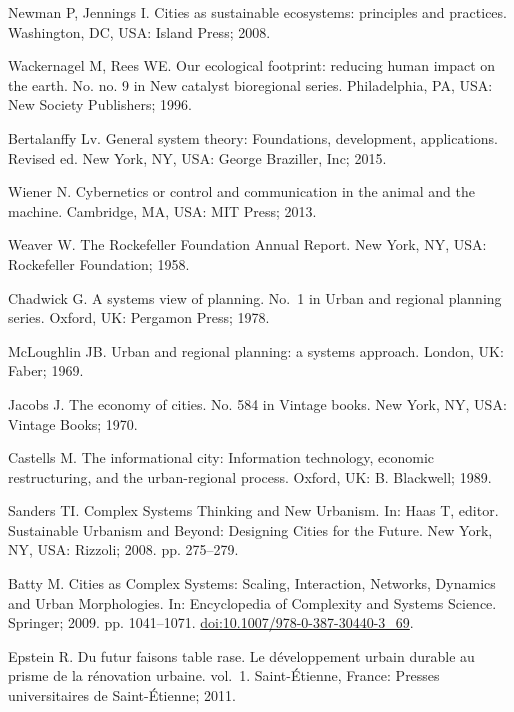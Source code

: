 \documentclass[10pt,a4paper]{article}
\begin{document}
\begin{multicols}{2}
\begin{footnotesize}
\begin{thebibliography}{100}
Newman P, Jennings I.
\newblock Cities as sustainable ecosystems: principles and practices.
\newblock Washington, DC, USA: Island Press; 2008.

Wackernagel M, Rees WE.
\newblock Our ecological footprint: reducing human impact on the earth.
\newblock No. no. 9 in New catalyst bioregional series. Philadelphia, PA, USA:
  New Society Publishers; 1996.

Bertalanffy Lv.
\newblock General system theory: Foundations, development, applications.
\newblock Revised ed. New York, NY, USA: George Braziller, Inc; 2015.

Wiener N.
\newblock Cybernetics or control and communication in the animal and the
  machine.
\newblock Cambridge, MA, USA: MIT Press; 2013.

Weaver W.
\newblock The {Rockefeller} {Foundation} {Annual} {Report}.
\newblock New York, NY, USA: Rockefeller Foundation; 1958.

Chadwick G.
\newblock A systems view of planning.
\newblock No.~1 in Urban and regional planning series. Oxford, UK: Pergamon
  Press; 1978.

McLoughlin JB.
\newblock Urban and regional planning: a systems approach.
\newblock London, UK: Faber; 1969.

Jacobs J.
\newblock The economy of cities.
\newblock No. 584 in Vintage books. New York, NY, USA: Vintage Books; 1970.

Castells M.
\newblock The informational city: Information technology, economic
  restructuring, and the urban-regional process.
\newblock Oxford, UK: B. Blackwell; 1989.

Sanders TI.
\newblock Complex {Systems} {Thinking} and {New} {Urbanism}.
\newblock In: Haas T, editor. Sustainable {Urbanism} and {Beyond}: {Designing}
  {Cities} for the {Future}. New York, NY, USA: Rizzoli; 2008. pp. 275--279.

Batty M.
\newblock Cities as Complex Systems: Scaling, Interaction, Networks, Dynamics
  and Urban Morphologies.
\newblock In: Encyclopedia of Complexity and Systems Science. Springer; 2009.
  pp. 1041--1071.
\newblock
  \href{https://doi.org/10.1007/978-0-387-30440-3\_69}{doi:10.1007/978-0-387-30440-3\_69}.

Epstein R.
\newblock Du futur faisons table rase. {Le} développement urbain durable au
  prisme de la rénovation urbaine. vol.~1.
\newblock Saint-Étienne, France: Presses universitaires de Saint-Étienne;
  2011.


\end{thebibliography}
\end{footnotesize}
\end{multicols}
\end{document}
